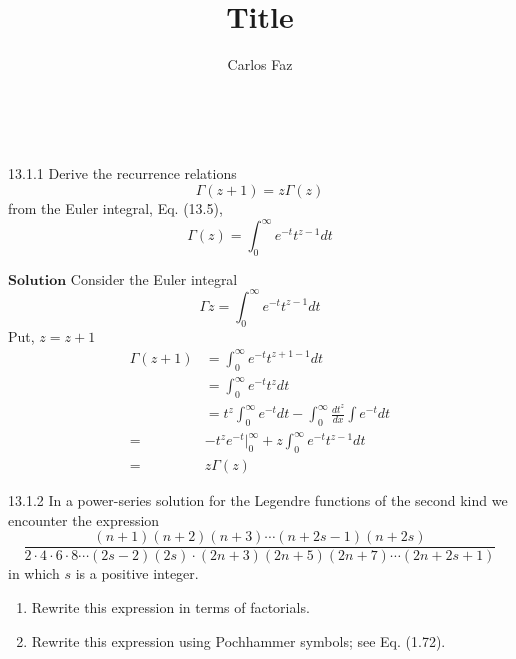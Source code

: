 \documentclass{article}
\title{Title}
\author{Carlos Faz}
\date{ \ }
\begin{document}
\begin{flushleft}


\begin{mybox}{13.1.1}
Derive the recurrence relations
$$
\Gamma(z+1)=z \Gamma(z)
$$
from the Euler integral, Eq. (13.5),
$$
\Gamma(z)=\int_{0}^{\infty} e^{-t} t^{z-1} d t
$$
\end{mybox}

$\boxed{\textbf{Solution}}$ Consider the Euler integral 
$$\Gamma z=\int_{0}^{\infty} e^{-t} t^{z-1} d t$$
Put, $z=z+1$
$$
\begin{aligned}
\Gamma(z+1) &=\int_{0}^{\infty} e^{-t} t^{z+1-1} d t \\
&=\int_{0}^{\infty} e^{-t} t^{z} d t \\
&=t^{z} \int_{0}^{\infty} e^{-t} d t-\int_{0}^{\infty} \frac{d t^{z}}{d x} \int e^{-t} d t \\
=&-t^{z} e^{-t}\Big|_{0} ^{\infty}+z \int_{0}^{\infty} e^{-t} t^{z-1} d t \\
=& z \Gamma(z)
\end{aligned}
$$

\newpage

\begin{mybox}{13.1.2}
In a power-series solution for the Legendre functions of the second kind we encounter the expression
$$
\frac{(n+1)(n+2)(n+3) \cdots(n+2 s-1)(n+2 s)}{2 \cdot 4 \cdot 6 \cdot 8 \cdots(2 s-2)(2 s) \cdot(2 n+3)(2 n+5)(2 n+7) \cdots(2 n+2 s+1)}
$$
in which $s$ is a positive integer.
\begin{enumerate}[$(a)$]
\item Rewrite this expression in terms of factorials.
\item Rewrite this expression using Pochhammer symbols; see Eq. (1.72).
\end{enumerate}
\end{mybox}


\end{flushleft}
\end{document}

